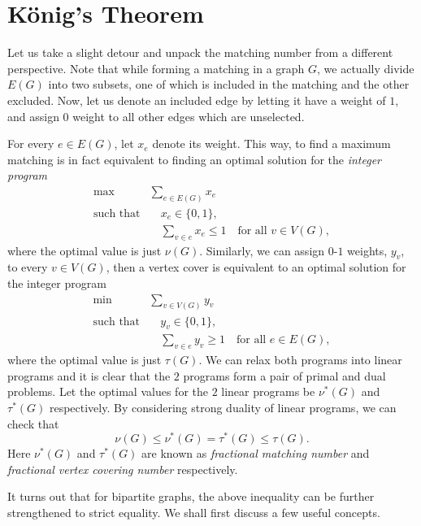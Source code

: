 \documentclass[math, code]{amznotes}
\theoremstyle{remark}
\begin{document}
\section{K\"{o}nig's Theorem}
Let us take a slight detour and unpack the matching number from a different perspective. Note that while forming a matching in a graph $G$, we actually divide $E(G)$ into two subsets, one of which is included in the matching and the other excluded. Now, let us denote an included edge by letting it have a weight of $1$, and assign $0$ weight to all other edges which are unselected.

For every $e \in E(G)$, let $x_e$ denote its weight. This way, to find a maximum matching is in fact equivalent to finding an optimal solution for the \textit{integer program}
\begin{align*}
    \max & \sum_{e \in E(G)}x_e \\
    \textrm{such that} & \quad x_e \in \{0, 1\}, \\
    & \quad \sum_{v \in e}x_e \leq 1 \quad\textrm{for all } v \in V(G),
\end{align*}
where the optimal value is just $\nu(G)$. Similarly, we can assign $0$-$1$ weights, $y_v$, to every $v \in V(G)$, then a vertex cover is equivalent to an optimal solution for the integer program 
\begin{align*}
    \min & \sum_{v \in V(G)}y_v \\
    \textrm{such that} & \quad y_v \in \{0, 1\}, \\
    & \quad \sum_{v \in e}y_v \geq 1 \quad \textrm{for all } e \in E(G),
\end{align*}
where the optimal value is just $\tau(G)$. We can relax both programs into linear programs and it is clear that the $2$ programs form a pair of primal and dual problems. Let the optimal values for the $2$ linear programs be $\nu^*(G)$ and $\tau^*(G)$ respectively. By considering strong duality of linear programs, we can check that
\begin{equation*}
    \nu(G) \leq \nu^*(G) = \tau^*(G) \leq \tau(G).
\end{equation*}
Here $\nu^*(G)$ and $\tau^*(G)$ are known as \textit{fractional matching number} and \textit{fractional vertex covering number} respectively.

It turns out that for bipartite graphs, the above inequality can be further strengthened to strict equality. We shall first discuss a few useful concepts.
\end{document}
